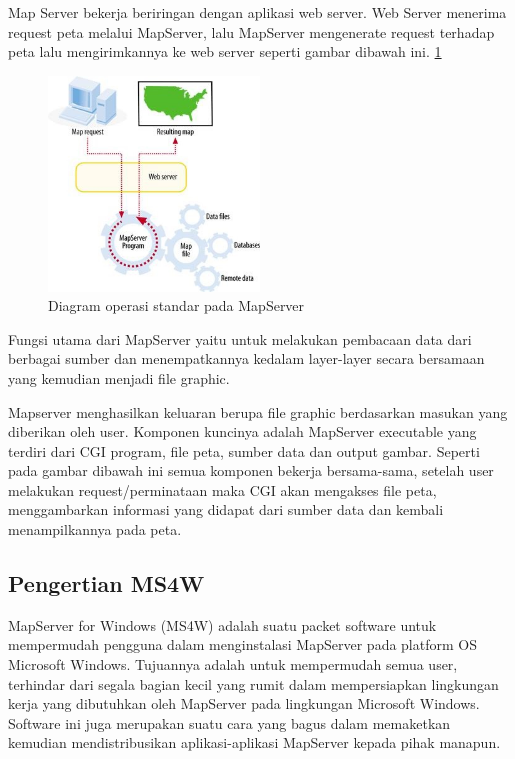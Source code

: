 Map Server bekerja beriringan dengan aplikasi web server. Web Server menerima request peta melalui MapServer, lalu MapServer mengenerate request terhadap peta lalu mengirimkannya ke web server seperti gambar dibawah ini. \ref{gambar5}
\begin{figure}[ht]
	    \centerline{\includegraphics[width=0.50\textwidth]{figures/gambar5.JPG}}
	    \caption{Diagram operasi standar pada MapServer}
		\label{gambar5}
		\end{figure}
Fungsi utama dari MapServer yaitu untuk melakukan pembacaan data dari berbagai sumber dan menempatkannya kedalam layer-layer secara bersamaan yang kemudian menjadi file graphic.

Mapserver menghasilkan keluaran berupa file graphic berdasarkan masukan yang diberikan oleh user. Komponen kuncinya adalah MapServer executable yang terdiri dari CGI program, file peta, sumber data dan output gambar. Seperti pada gambar dibawah ini semua komponen bekerja bersama-sama, setelah user melakukan request/perminataan maka CGI akan mengakses file peta, menggambarkan informasi yang didapat dari sumber data dan kembali menampilkannya pada peta.

\subsection{Pengertian MS4W}
MapServer for Windows (MS4W) adalah suatu packet software untuk mempermudah pengguna dalam menginstalasi MapServer pada platform OS Microsoft Windows. Tujuannya adalah untuk mempermudah semua user, terhindar dari segala bagian kecil yang rumit dalam mempersiapkan lingkungan kerja yang dibutuhkan oleh MapServer pada lingkungan Microsoft Windows. Software ini juga merupakan suatu cara yang bagus dalam memaketkan kemudian mendistribusikan aplikasi-aplikasi MapServer kepada pihak manapun.

